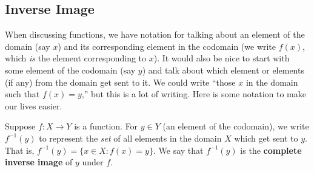 \documentclass[10pt,]{memoir}
\newcommand{\terminology}[1]{\textbf{#1}}
\theoremstyle{plain}
\theoremstyle{definition}
\theoremstyle{definition}
\theoremstyle{definition}
\numberwithin{equation}{chapter}
\def\inv{^{-1}}
\def\st{:}
\begin{document}
\subsection[Inverse Image]{Inverse Image}\label{subsection-9}

      When discussing functions, we have notation for talking about an element of the domain (say \(x\)) and its corresponding element in the codomain (we write \(f(x)\), which \emph{is} the element corresponding to \(x\)). It would also be nice to start with some element of the codomain (say \(y\)) and talk about which element or elements (if any) from the domain get sent to it. We could write ``those \(x\) in the domain such that \(f(x) = y\),'' but this is a lot of writing. Here is some notation to make our lives easier.
\par

      Suppose \(f:X \to Y\) is a function. For \(y \in Y\) (an element of the codomain), we write \(f\inv(y)\)\label{notation-4}
 to represent the \emph{set} of all elements in the domain \(X\) which get sent to \(y\). That is, \(f\inv(y) = \{x \in X \st f(x) = y\}\). We say that \(f\inv(y)\) is the
      \terminology{complete inverse image} of \(y\) under \(f\).
\par
\end{document}
